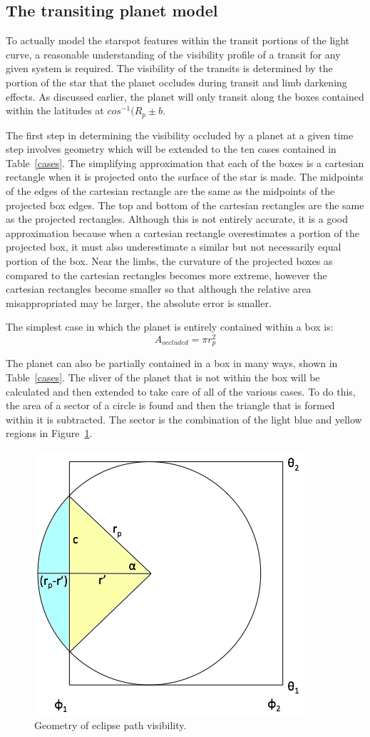 \subsection{The transiting planet model \label{transit_model}}
To actually model the starspot features within the transit portions of the light curve, a reasonable understanding of the visibility profile of a transit for any given system is required. The visibility of the transits is determined by the portion of the star that the planet occludes during transit and limb darkening effects. As discussed earlier, the planet will only transit along the boxes contained within the latitudes at $cos^{-1}(R_p \pm b$. 
 
The first step in determining the visibility occluded by a planet at a given time step involves geometry which will be extended to the ten cases contained in Table~\ref{cases}. The simplifying approximation that each of the boxes is a cartesian rectangle when it is projected onto the surface of the star is made. The midpoints of the edges of the cartesian rectangle are the same as the midpoints of the projected box edges. The top and bottom of the cartesian rectangles are the same as the projected rectangles. Although this is not entirely accurate, it is a good approximation because when a cartesian rectangle overestimates a portion of the projected box, it must also underestimate a similar but not necessarily equal portion of the box. Near the limbs, the curvature of the projected boxes as compared to the cartesian rectangles becomes more extreme, however the cartesian rectangles become smaller so that although the relative area misappropriated may be larger, the absolute error is smaller.

The simplest case in which the planet is entirely contained within a box is:
\begin{equation}
	A_{occluded} = \pi r_p^2
\end{equation}

The planet can also be partially contained in a box in many ways, shown in Table~\ref{cases}. The sliver of the planet that is not within the box will be calculated and then extended to take care of all of the various cases. To do this, the area of a sector of a circle is found and then the triangle that is formed within it is subtracted. The sector is the combination of the light blue and yellow regions in Figure~\ref{eclipse}.
\begin{figure}[h]
	\centering
	\includegraphics[width=.5\textwidth]{images/figure.png}
	\caption{Geometry of eclipse path visibility.}
	\label{eclipse}
\end{figure}


